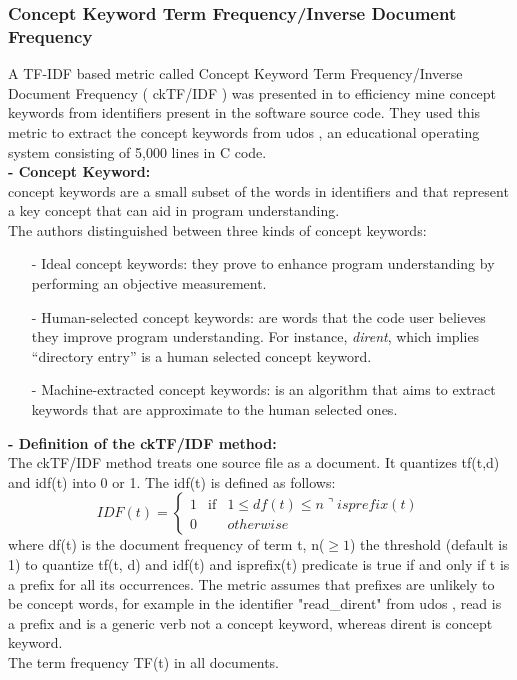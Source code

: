 \subsubsection*{Concept Keyword Term Frequency/Inverse Document Frequency}
A TF-IDF based metric called Concept Keyword Term Frequency/Inverse Document Frequency ( ckTF/IDF ) was presented in \cite{a:ck} to efficiency mine concept keywords from identifiers present in the software source code. They used this metric to extract the concept keywords from udos \cite{a:udos}, an educational operating system consisting of 5,000 lines in C code.\\
\textbf{- Concept Keyword:}\\
concept keywords are a small subset of the words in identifiers and that represent a key concept that can aid in program understanding.\\
The authors distinguished between three kinds of concept keywords:
\begin{itemize}
\item [-] Ideal concept keywords: they prove to enhance program understanding by performing an objective measurement. 
\item [-] Human-selected concept keywords: are words that the code user believes they improve program understanding. For instance, \emph{dirent}, which implies “directory entry” is a human selected concept keyword.
\item [-] Machine-extracted concept keywords: is an algorithm that aims to extract keywords that are approximate to the human selected ones.
\end{itemize}
\textbf{- Definition of the ckTF/IDF method:}\\
The ckTF/IDF method treats one source file as a document. It quantizes tf(t,d) and idf(t) into 0 or 1. The idf(t) is defined as follows:\\
\begin{equation}
IDF(t) = \left\{ \begin{array}{rcl}
1 & \mbox{if} &
1 \leq df(t) \leq n  \urcorner isprefix(t)\\ 0 && otherwise
\end{array}\right.
\end{equation}
where df(t) is the document frequency of term t, n($\geq 1$) the threshold (default is 1) to quantize tf(t, d) and idf(t) and isprefix(t) predicate is true if and only if t is a prefix for all its occurrences. The metric assumes that prefixes are unlikely to be concept words, for example in the identifier "read\_dirent" from udos \cite{a:udos}, read is a prefix and is a generic verb not a concept keyword, whereas dirent is concept keyword.  \\The term frequency TF(t) in all documents.
